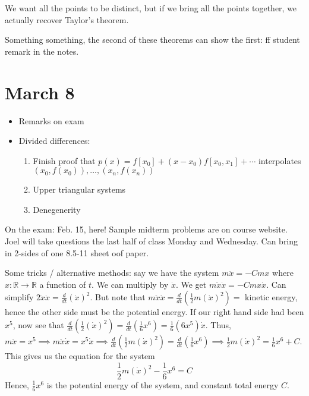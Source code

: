 \documentclass{article}
\theoremstyle{plain}
\theoremstyle{remark}
\newcommand{\R}{{\mathbb R}}
\begin{document}
We want all the points to be distinct, but if we bring all the points together,
we actually recover Taylor's theorem.

Something something, the second of these theorems can show the first:
ff student remark in the notes.


\section{March 8}
\begin{itemize}
	\item Remarks on exam
	\item Divided differences:
		\begin{enumerate}
			\item Finish proof that $p(x) = f[x_0] + (x-x_0)f[x_0,x_1] + \cdots$
				interpolates $(x_0,f(x_0)),\dots,(x_n,f(x_n))$
			\item Upper triangular systems
			\item Denegenerity
		\end{enumerate}
\end{itemize}

On the exam: Feb. 15, here!
Sample midterm problems are on course website.
Joel will take questions the last half of class Monday and Wednesday.
Can bring in 2-sides of one 8.5-11 sheet oof paper.

Some tricks / alternative methods:
say we have the system $m\ddot{x} = -Cmx$ where $x \colon \R \to \R$ a function of $t$.
We can multiply by $\dot{x}$.
We get $m \ddot{x}\dot{x} = - Cmx\dot{x}$.
Can simplify $2\ddot{x}\dot{x} = \frac{d}{dt} (\dot{x})^2$.
But note that $m\ddot{x}\dot{x} = \frac{d}{dt}\left(\frac12 m(\dot{x})^2\right) = $ kinetic energy,
hence the other side must be the potential energy.
If our right hand side had been $x^5$, now see that
$\frac{d}{dt}\left(\frac12(\dot{x})^2\right) = \frac{d}{dt}\left(\frac16 x^6\right)
= \frac16 (6x^5) \dot{x}$.
Thus, $m\ddot{x} = x^5 \implies m\ddot{x}\dot{x} = x^5 \dot{x}
\implies \frac{d}{dt}\left(\frac12 m(\dot{x})^2 \right) = \frac{d}{dt}\left(\frac16 x^6\right)
\implies \frac12 m(\dot{x})^2 = \frac16 x^6 + C$.
This gives us the equation for the system
\[
	\frac12 m(\dot{x})^2  - \frac16 x^6 = C
\]
Hence, $\frac16 x^6$ is the potential energy of the system,
and constant total energy $C$.
\end{document}
